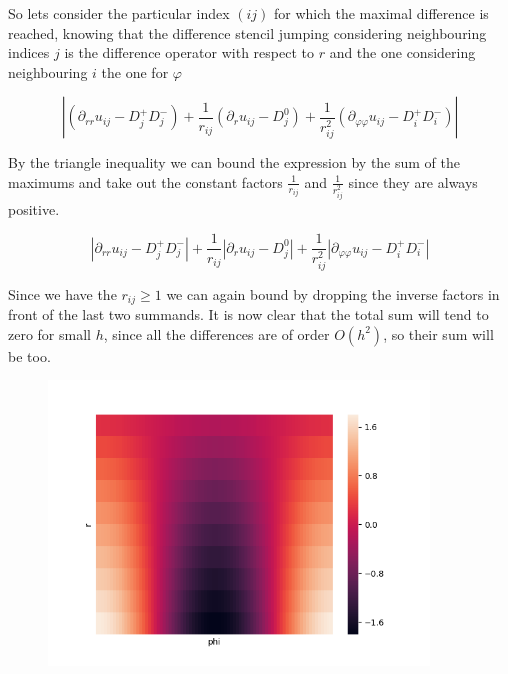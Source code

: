 So lets consider the particular index $(ij)$ for which the maximal difference is reached, knowing that the difference stencil jumping considering neighbouring indices $j$ is the difference operator with respect to $r$ and the one considering neighbouring $i$ the one for $\varphi$

\begin{equation*}
    |(\partial_{rr}u_{ij}-D^{+}_jD^{-}_j)
    +\frac{1}{r_{ij}}(\partial_{r}u_{ij}-D^{0}_j)
    +\frac{1}{r_{ij}^2}(\partial_{\varphi\varphi}u_{ij}-D^{+}_iD^{-}_i)|
\end{equation*}

By the triangle inequality we can bound the expression by the sum of the maximums and take out the constant factors $\frac{1}{r_{ij}}$ and $\frac{1}{r_{ij}^2}$ since they are always positive.

\begin{equation*}
    |\partial_{rr}u_{ij}-D^{+}_jD^{-}_j|
    +\frac{1}{r_{ij}}|\partial_{r}u_{ij}-D^{0}_j|
    +\frac{1}{r_{ij}^2}|\partial_{\varphi\varphi}u_{ij}-D^{+}_iD^{-}_i|
\end{equation*}

Since we have the $r_{ij}\geq 1$ we can again bound by dropping the inverse factors in front of the last two summands. It is now clear that the total sum will tend to zero for small $h$, since all the differences are of order $O(h^2)$, so their sum will be too.

%
\begin{figure}[H]
	\centering
	\includegraphics[width=0.9\textwidth]{Documentation/Figures/a06ex02c_uh.png} 
	\caption{}
	\label{fig:a05ex02b}
\end{figure}

